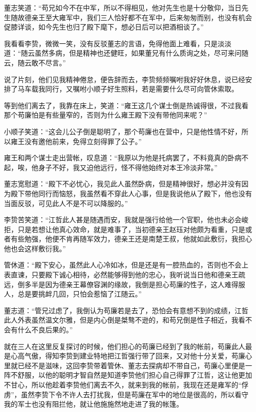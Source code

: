 董志笑道：“苟兄如今不在中军，所以不得相见，他对先生也是十分敬仰，当日先生随故德亲王至大雍军中，我们三人恰好都不在军中，后来匆匆而别，也没有机会促膝详谈，如今先生也归了殿下麾下，想必日后可以把酒相谈了。”

我看看李贽，微微一笑，没有反驳董志的言语，免得他面上难看，只是淡淡道：“随云虽然多病，但是精神也还健旺，如果董兄有什么质询之处，尽可来问随云，随云敢不尽言。”

说了片刻，他们见我精神倦怠，便告辞而去，李贽频频嘱咐我好好休息，说已经安排了马车载我同行，又嘱咐小顺子好生照料，若是需要什么尽可向管休索取。

等到他们离去了，我靠在床上，笑道：“雍王这几个谋士倒是热诚得很，不过我看那个苟廉怕是有些量窄的，否则为什么雍王殿下没有带他同来呢？”

小顺子笑道：“这会儿公子倒是聪明了，那个苟廉也在营中，只是他性情不好，所以雍王没有邀他前来，免得立刻得罪了公子。”

雍王和两个谋士走出营帐，叹息道：“我原以为他是托病罢了，不料竟真的卧病不起，唉，他身子不好，我又迫他远行，怪不得他始终对本王冷淡非常。”

董志宽慰道：“殿下不必忧心，我见此人虽然卧病，但是精神很好，想必并没有因为殿下带他同行而恼怒，我虽然看不穿此人心事，但是我说他从了殿下，他也没有当面反驳，可见此人不是不可以降服的。”

李贽苦笑道：“江哲此人甚是随遇而安，我就是强行给他一个官职，他也未必会峻拒，只是若想让他真心效命，就是难事了，当初德亲王赵珏对他颇为看重，只是或者有些勉强，他便不肯再随军效力，德亲王还是南楚王叔，他就如此敷衍，我担心他也会这样敷衍我。”

管休道：“殿下安心，虽然此人心冷如冰，但是还是有一腔热血的，否则也不会上表直谏，只要殿下诚心相待，必然能够得到他的忠心，我听说当日他和德亲王疏远，倒多半是因为德亲王幕僚容渊的缘故，我倒是担心苟廉的性子，这人难得服人，总是要挑衅几回，只怕会惹恼了江随云。”

董志道：“管兄过虑了，我倒认为苟廉若是去了，恐怕会有意想不到的成绩，江哲此人外表虽然温文尔雅，但是内心倒是桀骜不逊的，和苟兄倒是性子相近，我看不会有什么不良后果的。”

就在三人在这里反复探讨的时候，他们担心的苟廉已经到了我的帐前，苟廉此人最是心高气傲，得知李贽到建业特地把江哲强行带了回来，又对他十分关爱，苟廉心里就已经不是滋味，这回李贽带着管休、董志去探病却不带自己，苟廉心里便是一阵不舒服，以他的聪明才智自然是知道李贽他们担心自己得罪了江哲，这让他更加不甘心，所以他趁着李贽他们离去不久，就来到我的帐前，我现在还是雍军的“俘虏”，虽然李贽下令不许人去打扰我，但是苟廉在军中的地位是很高的，所以看守我的军士也没有阻拦他，就让他施施然地走进了我的帐篷。

